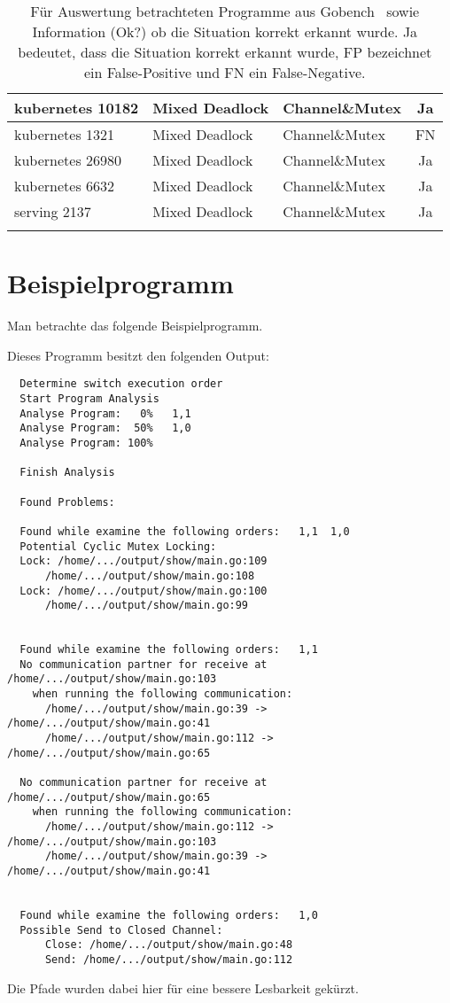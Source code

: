 \begin{longtable}[c]{|l|l|l|c|}
  kubernetes 10182      & Mixed Deadlock         & Channel\&Mutex         & Ja                                   \\ \hline
  kubernetes 1321      & Mixed Deadlock         & Channel\&Mutex         & FN                                 \\ \hline
  kubernetes 26980      & Mixed Deadlock         & Channel\&Mutex         & Ja                                   \\ \hline
  kubernetes 6632      & Mixed Deadlock         & Channel\&Mutex         & Ja                                   \\ \hline
  serving 2137      & Mixed Deadlock         & Channel\&Mutex         & Ja                                   \\ \hline
  \caption{Für Auswertung betrachteten 
  Programme aus Gobench~\cite{gobench} sowie 
  Information (Ok?) ob die Situation korrekt erkannt wurde. Ja bedeutet, dass 
  die Situation korrekt erkannt wurde, FP bezeichnet ein False-Positive
  und FN ein False-Negative. }
  \label{App-Goker}
  \end{longtable}


\chapter{Beispielprogramm}\label{Appendix-2}
Man betrachte das folgende Beispielprogramm.
  
% 
% 

Dieses Programm besitzt den folgenden Output:
\begin{verbatim}
  Determine switch execution order
  Start Program Analysis
  Analyse Program:   0%   1,1
  Analyse Program:  50%   1,0
  Analyse Program: 100%
  
  Finish Analysis
  
  Found Problems:
  
  Found while examine the following orders:   1,1  1,0
  Potential Cyclic Mutex Locking:
  Lock: /home/.../output/show/main.go:109
      /home/.../output/show/main.go:108
  Lock: /home/.../output/show/main.go:100
      /home/.../output/show/main.go:99
  
  
  Found while examine the following orders:   1,1
  No communication partner for receive at /home/.../output/show/main.go:103 
    when running the following communication:
      /home/.../output/show/main.go:39 -> /home/.../output/show/main.go:41
      /home/.../output/show/main.go:112 -> /home/.../output/show/main.go:65
  
  No communication partner for receive at /home/.../output/show/main.go:65 
    when running the following communication:
      /home/.../output/show/main.go:112 -> /home/.../output/show/main.go:103
      /home/.../output/show/main.go:39 -> /home/.../output/show/main.go:41
  
  
  Found while examine the following orders:   1,0
  Possible Send to Closed Channel:
      Close: /home/.../output/show/main.go:48
      Send: /home/.../output/show/main.go:112  
\end{verbatim}
Die Pfade wurden dabei hier für eine bessere Lesbarkeit gekürzt. 
